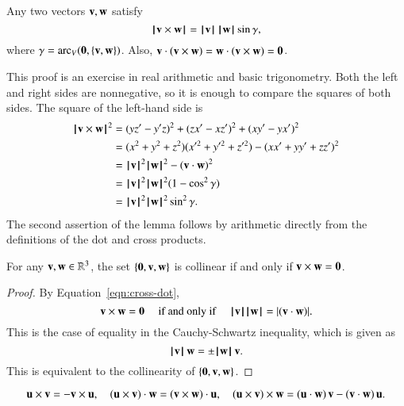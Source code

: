 \begin{lemma}[]  
\label{lemma:los-cross}
Any two vectors $\v,\w$ satisfy
\[ \normo{\v \times \w} =
  \normo{\v}\,\normo{\w}\sin\gamma,\] 
where $\gamma=\arc_V(\orz,\{\v,\w\})$.
Also, $\v \cdot (\v\times \w) = \w\cdot (\v\times \w) = \orz$.
\end{lemma}

\begin{proved} This proof is an exercise in
  real arithmetic and basic trigonometry.
  Both the left and
  right sides are nonnegative, so it is
  enough to compare the squares of both sides.  The square of the
  left-hand side is
\begin{align}\label{eqn:cross-dot}
  \normo{\v \times \w}^2 &= (y z'- y'z)^2 + (z x' - x z')^2 + (x y' - y x')^2 \notag\\
  &= %
  (x^2 + y^2 + z^2)(x'^2 + y'^2 + z'^2) - (x x' + y y' + z z')^2
 \notag \\&= %
  \normo{\v}^2\normo{\w}^2 - (\v\cdot \w)^2\\
  &= %
  \normo{\v}^2\normo{\w}^2 ( 1 - \cos^2\gamma)\notag\\
  &= %
\normo{\v}^2\normo{\w}^2 \sin^2\gamma.\notag
\end{align}
The second assertion of the lemma follows by arithmetic directly from
the definitions of the dot and cross products.  \swallowed\end{proved}

\begin{lemma}[]\label{lemma:cross-collinear}
For any $\v,\w\in\ring{R}^3$,
the set $\{\orz,\v,\w\}$ is collinear if and only if $\v\times\w=\orz$.
\end{lemma}

\begin{proof}
By Equation~\ref{eqn:cross-dot},
\[
\v\times\w = \orz \quad\text{ if and only if }\quad \normo{\v}\normo{\w} = | (\v\cdot \w) |.
\]
This is the case of equality in the Cauchy-Schwartz inequality, which is given as
%
%
\[
\normo{\v} \,\w = \pm \normo{\w}\,\v.
\]
This is equivalent to the collinearity of $\{\orz,\v,\w\}$.
\end{proof}

\begin{lemma}[]\label{lemma:cross-id}
\[ 
\u\times \v = -\v\times \u,\quad
(\u\times \v)\cdot \w = (\v\times \w)\cdot \u,\quad
(\u\times  \v)\times \w = (\u\cdot \w)\, \v - (\v\cdot\w) \,\u.
\] 
\end{lemma}

